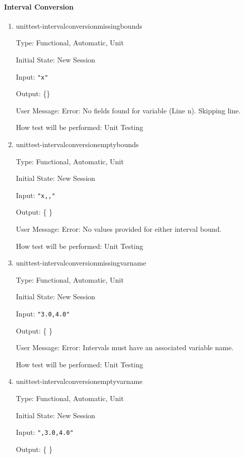 \documentclass[12pt, titlepage]{article}
\begin{document}
\paragraph{Interval Conversion}
\begin{enumerate}
	
	\item{unittest-intervalconversionmissingbounds}
	
	Type: Functional, Automatic, Unit
	
	Initial State: New Session
	
	Input: \texttt{"x"}
	
	Output: \{\}
	
	User Message: Error: No fields found for variable (Line n). Skipping line.
	
	How test will be performed: Unit Testing\\
	
	\item{unittest-intervalconversionemptybounds}
	
	Type: Functional, Automatic, Unit
	
	Initial State: New Session
	
	Input: \texttt{"x,,"}
	
	Output: \{   \}
	
	User Message: Error: No values provided for either interval bound.
	
	How test will be performed: Unit Testing\\
	
	\item{unittest-intervalconversionmissingvarname}
	
	Type: Functional, Automatic, Unit
	
	Initial State: New Session
	
	Input: \texttt{"3.0,4.0"}
	
	Output: \{   \}
	
	User Message: Error: Intervals must have an associated variable name.
	
	How test will be performed: Unit Testing\\
	
	\item{unittest-intervalconversionemptyvarname}
	
	Type: Functional, Automatic, Unit
	
	Initial State: New Session
	
	Input: \texttt{",3.0,4.0"}
	
	Output: \{   \}
	

\end{enumerate}
\end{document}
